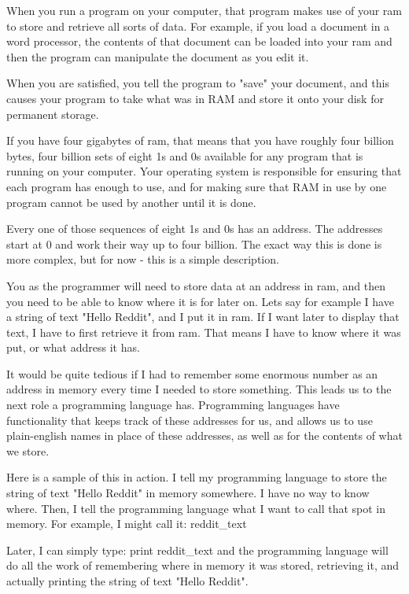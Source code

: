 \documentclass[a4paper,12pt]{article}
\begin{document}
When you run a program on your computer, that program makes use of your ram to store and retrieve all sorts of data. For example, if you load a document in a word processor, the contents of that document can be loaded into your ram and then the program can manipulate the document as you edit it.

When you are satisfied, you tell the program to "save" your document, and this causes your program to take what was in RAM and store it onto your disk for permanent storage.

If you have four gigabytes of ram, that means that you have roughly four billion bytes, four billion sets of eight 1s and 0s available for any program that is running on your computer. Your operating system is responsible for ensuring that each program has enough to use, and for making sure that RAM in use by one program cannot be used by another until it is done.

Every one of those sequences of eight 1s and 0s has an address. The addresses start at 0 and work their way up to four billion. The exact way this is done is more complex, but for now - this is a simple description.

You as the programmer will need to store data at an address in ram, and then you need to be able to know where it is for later on. Lets say for example I have a string of text "Hello Reddit", and I put it in ram. If I want later to display that text, I have to first retrieve it from ram. That means I have to know where it was put, or what address it has.

It would be quite tedious if I had to remember some enormous number as an address in memory every time I needed to store something. This leads us to the next role a programming language has. Programming languages have functionality that keeps track of these addresses for us, and allows us to use plain-english names in place of these addresses, as well as for the contents of what we store.

Here is a sample of this in action. I tell my programming language to store the string of text "Hello Reddit" in memory somewhere. I have no way to know where. Then, I tell the programming language what I want to call that spot in memory. For example, I might call it: reddit\_text

Later, I can simply type: print reddit\_text and the programming language will do all the work of remembering where in memory it was stored, retrieving it, and actually printing the string of text "Hello Reddit".
\end{document}
